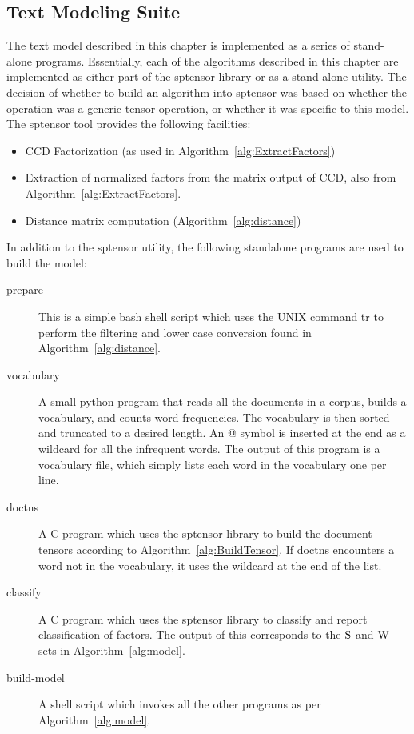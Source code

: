 \documentclass[../ut-dissertation.tex]{subfiles}
\begin{document}
\subsection{Text Modeling Suite}
The text model described in this chapter is implemented as a series of
stand-alone programs.  Essentially, each of the algorithms described
in this chapter are implemented as either part of the sptensor library
or as a stand alone utility.  The decision of whether to build an
algorithm into sptensor was based on whether the operation was a
generic tensor operation, or whether it was specific to this model.
The sptensor tool provides the following facilities:
\begin{itemize}
\item CCD Factorization (as used in Algorithm~\ref{alg:ExtractFactors})
\item Extraction of normalized factors from the matrix output of CCD,
  also from Algorithm~\ref{alg:ExtractFactors}.
\item Distance matrix computation (Algorithm~\ref{alg:distance})
\end{itemize}

In addition to the sptensor utility, the following standalone
programs are used to build the model:
\begin{description}
\item[prepare] This is a simple bash shell script which uses the UNIX
  command tr to perform the filtering and lower case conversion found
  in Algorithm~\ref{alg:distance}.
\item[vocabulary] A small python program that reads all the documents
  in a corpus, builds a vocabulary, and counts word frequencies.  The
  vocabulary is then sorted and truncated to a desired length.  An @
  symbol is inserted at the end as a wildcard for all the infrequent
  words.  The output of this program is a vocabulary file, which
  simply lists each word in the vocabulary one per line.
\item[doctns] A C program which uses the sptensor library to build the
  document tensors according to Algorithm~\ref{alg:BuildTensor}.  If
  doctns encounters a word not in the vocabulary, it uses the wildcard
  at the end of the list.
\item[classify] A C program which uses the sptensor library to
  classify and report classification of factors.  The output of this
  corresponds to the $\mathrm{S}$ and $\mathrm{W}$ sets in Algorithm~\ref{alg:model}.
\item[build-model] A shell script which invokes all the other
  programs as per Algorithm~\ref{alg:model}.
\end{description}
\end{document}

